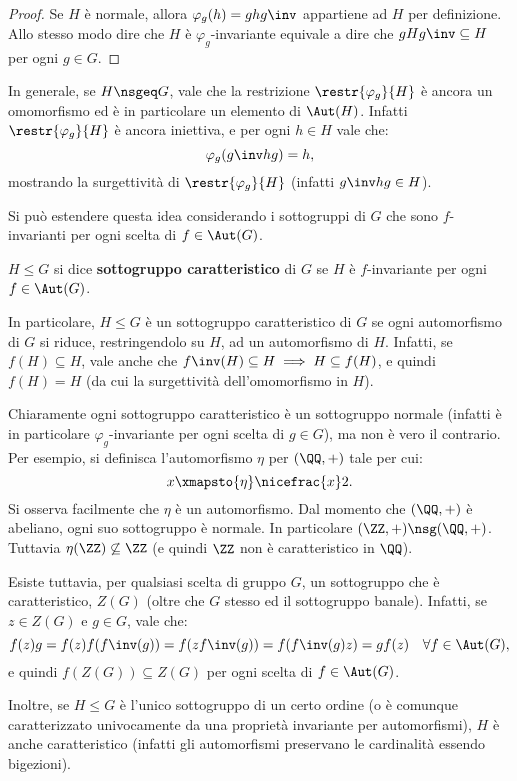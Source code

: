 \documentclass[12pt]{scrartcl}
\begin{document}
	\begin{proof}
		Se $H$ è normale, allora $\varphi_g(h) = g h g\inv$ appartiene ad $H$ per
		definizione. Allo stesso modo dire che $H$ è $\varphi_g$-invariante
		equivale a dire che $gHg\inv \subseteq H$ per ogni $g \in G$.
	\end{proof} \bigskip


	In generale, se $H \nsgeq G$, vale che la restrizione $\restr{\varphi_g}{H}$ è
	ancora un omomorfismo ed è in particolare un elemento di $\Aut(H)$. Infatti
	$\restr{\varphi_g}{H}$ è ancora iniettiva, e per ogni $h \in H$ vale che:
	\[ \varphi_g(g\inv h g) = h, \]
	mostrando la surgettività di $\restr{\varphi_g}{H}$ (infatti $g\inv h g \in H$). \bigskip


	Si può estendere questa idea considerando i sottogruppi di $G$ che sono $f$-invarianti
	per ogni scelta di $f \in \Aut(G)$.
	
	\begin{definition}
		$H \leq G$ si dice \textbf{sottogruppo caratteristico} di $G$ se $H$
		è $f$-invariante per ogni $f \in \Aut(G)$.
	\end{definition} \smallskip
	
	In particolare, $H \leq G$ è un sottogruppo caratteristico di $G$ se ogni
	automorfismo di $G$ si riduce, restringendolo su $H$, ad un automorfismo
	di $H$. Infatti, se $f(H) \subseteq H$, vale anche che $f\inv(H) \subseteq H \implies
	H \subseteq f(H)$, e quindi $f(H) = H$ (da cui la surgettività dell'omomorfismo
	in $H$). \bigskip
	

	Chiaramente ogni sottogruppo caratteristico è un sottogruppo normale (infatti è
	in particolare $\varphi_g$-invariante per ogni scelta di $g \in G$), ma non è
	vero il contrario. Per esempio, si definisca l'automorfismo $\eta$ per $(\QQ, +)$
	tale per cui:
	\[ x \xmapsto{\eta} \nicefrac{x}2. \]
	Si osserva facilmente che $\eta$ è un automorfismo. Dal momento che $(\QQ, +)$ è
	abeliano, ogni suo sottogruppo è normale. In particolare $(\ZZ, +) \nsg (\QQ, +)$.
	Tuttavia $\eta(\ZZ) \not\subseteq \ZZ$ (e quindi $\ZZ$ non è caratteristico in $\QQ$). \bigskip
	
	
	Esiste tuttavia, per qualsiasi scelta di gruppo $G$, un sottogruppo che è caratteristico,
	$Z(G)$ (oltre che $G$ stesso ed il sottogruppo banale). Infatti, se $z \in Z(G)$ e
	$g \in G$, vale che:
	\[ f(z)g = f(z)f(f\inv(g)) = f(z f\inv(g)) = f(f\inv(g) z) = g f(z) \quad \forall f \in \Aut(G), \]
	e quindi $f(Z(G)) \subseteq Z(G)$ per ogni scelta di $f \in \Aut(G)$. \bigskip
	
	
	Inoltre, se $H \leq G$ è l'unico sottogruppo di un certo ordine (o è comunque
	caratterizzato univocamente da una proprietà invariante per automorfismi),
	$H$ è anche caratteristico (infatti gli automorfismi preservano le cardinalità essendo
	bigezioni).
\end{document}

